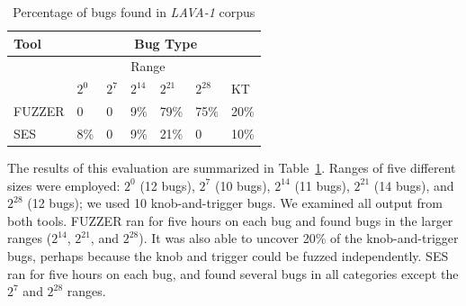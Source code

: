 \begin{table}[h]
\caption{Percentage of bugs found in \emph{LAVA-1} corpus} %
\centering\footnotesize
\begin{tabular}{l|l|l|l|l|l|l} 
Tool   &                     \multicolumn{6}{|c}{Bug Type}                           \\  \hline  
         &                     \multicolumn{5}{|c|}{Range}                   &     \\   
         &    $2^0$   & $2^7$       & $2^{14}$     & $2^{21}$   & $2^{28}$     & KT   \\  \hline 
FUZZER &    0       & 0           & 9\%          & 79\%       & 75\%         & 20\%      \\
SES    &    8\%     & 0           & 9\%          & 21\%       & 0            & 10\%         \\
\end{tabular}
\label{table:eval1-file}
\end{table}

The results of this evaluation are summarized in Table~\ref{table:eval1-file}.
Ranges of five different sizes were employed: $2^0$ (12 bugs), $2^7$ (10 bugs), $2^{14}$ (11 bugs), $2^{21}$ (14 bugs), and $2^{28}$ (12 bugs); we used 10 knob-and-trigger bugs.
We examined all output from both tools.
FUZZER ran for five hours on each bug and found bugs in the larger ranges ($2^{14}$, $2^{21}$, and $2^{28}$).
It was also able to uncover 20\% of the knob-and-trigger bugs, perhaps because the knob and trigger could be fuzzed independently.
SES ran for five hours on each bug, and found several bugs in all categories except the $2^7$ and $2^{28}$ ranges.

